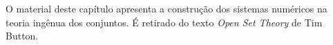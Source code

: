 \documentclass[../../../include/open-logic-section]{subfiles}
\begin{document}
	

\begin{editorial}
O material deste capítulo apresenta a construção dos sistemas numéricos
na teoria ingênua dos conjuntos. É retirado do texto \emph{Open Set
Theory} de Tim Button.
\end{editorial}


\OLEndChapterHook
\end{document}
